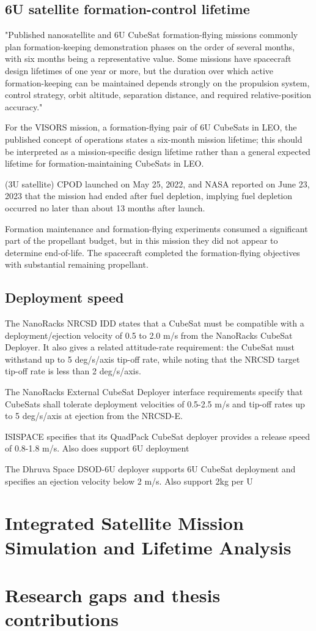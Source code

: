 \subsection{6U satellite formation-control lifetime}
"Published nanosatellite and 6U CubeSat formation-flying missions commonly plan formation-keeping demonstration phases on the order of several months, with six months being a representative value. Some missions have spacecraft design lifetimes of one year or more, but the duration over which active formation-keeping can be maintained depends strongly on the propulsion system, control strategy, orbit altitude, separation distance, and required relative-position accuracy."


For the VISORS mission, a formation-flying pair of 6U CubeSats in LEO, the published concept of operations states a six-month mission lifetime; this should be interpreted as a mission-specific design lifetime rather than a general expected lifetime for formation-maintaining CubeSats in LEO.\cite{lightsey2024visors_conops}

(3U satellite) CPOD launched on May 25, 2022, and NASA reported on June 23, 2023 that the mission had ended after fuel depletion, implying fuel depletion occurred no later than about 13 months after launch. \cite{nasa2023cpod}

Formation maintenance and formation-flying experiments consumed a significant part of the propellant budget, but in this mission they did not appear to determine end-of-life. The spacecraft completed the formation-flying objectives with substantial remaining propellant.\cite{roth2016canx45_flight_results}


\subsection{Deployment speed}
The NanoRacks NRCSD IDD states that a CubeSat must be compatible with a deployment/ejection velocity of 0.5 to 2.0 m/s from the NanoRacks CubeSat Deployer. It also gives a related attitude-rate requirement: the CubeSat must withstand up to 5 deg/s/axis tip-off rate, while noting that the NRCSD target tip-off rate is less than 2 deg/s/axis. \cite{nanoracks2018nrcsd_idd}


The NanoRacks External CubeSat Deployer interface requirements specify that CubeSats shall tolerate deployment velocities of 0.5-2.5 m/s and tip-off rates up to 5 deg/s/axis at ejection from the NRCSD-E. \cite{nanoracks2018nrcsde_idd}


ISISPACE specifies that its QuadPack CubeSat deployer provides a release speed of 0.8-1.8 m/s. Also does support 6U deployment \cite{isispace2026quadpack}

The Dhruva Space DSOD-6U deployer supports 6U CubeSat deployment and specifies an ejection velocity below 2 m/s. Also support 2kg per U \cite{satsearch2026dhruva_dsod6u}


\section{Integrated Satellite Mission Simulation and Lifetime Analysis}

\section{Research gaps and thesis contributions}



